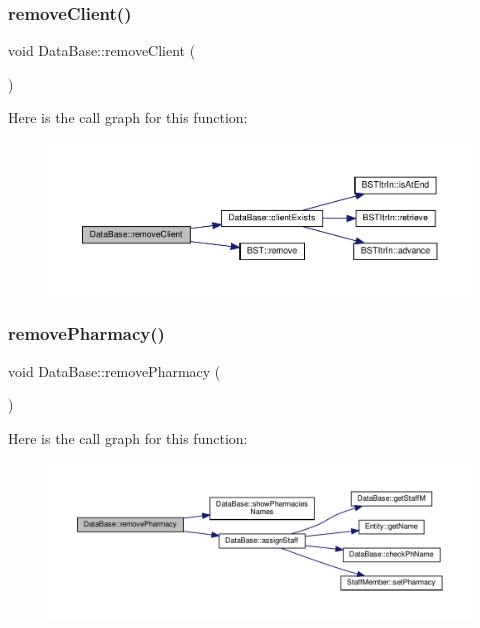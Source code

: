 \subsubsection{\texorpdfstring{remove\+Client()}{removeClient()}}
{\footnotesize\ttfamily void Data\+Base\+::remove\+Client (\begin{DoxyParamCaption}{ }\end{DoxyParamCaption})}

Here is the call graph for this function\+:\nopagebreak
\begin{figure}[H]
\begin{center}
\leavevmode
\includegraphics[width=350pt]{classDataBase_a9fb1b3625b3431d09b4b64a13bbb1e0f_cgraph}
\end{center}
\end{figure}
\mbox{\label{classDataBase_af923ee9db26814bf9413afe95262a01d}} 
\subsubsection{\texorpdfstring{remove\+Pharmacy()}{removePharmacy()}}
{\footnotesize\ttfamily void Data\+Base\+::remove\+Pharmacy (\begin{DoxyParamCaption}{ }\end{DoxyParamCaption})}

Here is the call graph for this function\+:\nopagebreak
\begin{figure}[H]
\begin{center}
\leavevmode
\includegraphics[width=350pt]{classDataBase_af923ee9db26814bf9413afe95262a01d_cgraph}
\end{center}
\end{figure}
\mbox{\label{classDataBase_a6be2328441f5fe20086a4f8b0002adee}} 
